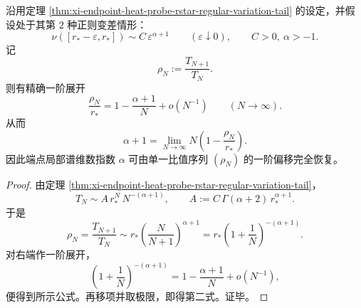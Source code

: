 \begin{theorem}[比值序列的一阶偏移恢复端点局部谱维数]\label{thm:xi-endpoint-heat-probe-ratio-recovers-local-spectral-dimension}
沿用定理 \ref{thm:xi-endpoint-heat-probe-rstar-regular-variation-tail} 的设定，并假设处于其第 \(2\) 种正则变差情形：
\[
\nu([r_\ast-\varepsilon,r_\ast])\sim C\,\varepsilon^{\alpha+1}
\qquad(\varepsilon\downarrow 0),
\qquad C>0,\ \alpha>-1.
\]
记
\[
\rho_N:=\frac{T_{N+1}}{T_N}.
\]
则有精确一阶展开
\[
\boxed{\;
\frac{\rho_N}{r_\ast}
=
1-\frac{\alpha+1}{N}+o(N^{-1})
\qquad(N\to\infty).\;}
\]
从而
\[
\boxed{\;
\alpha+1
=
\lim_{N\to\infty}N\left(1-\frac{\rho_N}{r_\ast}\right).\;}
\]
因此端点局部谱维数指数 \(\alpha\) 可由单一比值序列 \((\rho_N)\) 的一阶偏移完全恢复。
\end{theorem}
\begin{proof}
由定理 \ref{thm:xi-endpoint-heat-probe-rstar-regular-variation-tail}，
\[
T_N\sim A\,r_\ast^N\,N^{-(\alpha+1)},
\qquad
A:=C\,\Gamma(\alpha+2)\,r_\ast^{\alpha+1}.
\]
于是
\[
\rho_N=\frac{T_{N+1}}{T_N}
\sim
r_\ast\left(\frac{N}{N+1}\right)^{\alpha+1}
=
r_\ast\left(1+\frac{1}{N}\right)^{-(\alpha+1)}.
\]
对右端作一阶展开，
\[
\left(1+\frac{1}{N}\right)^{-(\alpha+1)}
=
1-\frac{\alpha+1}{N}+o(N^{-1}),
\]
便得到所示公式。再移项并取极限，即得第二式。证毕。
\end{proof}

